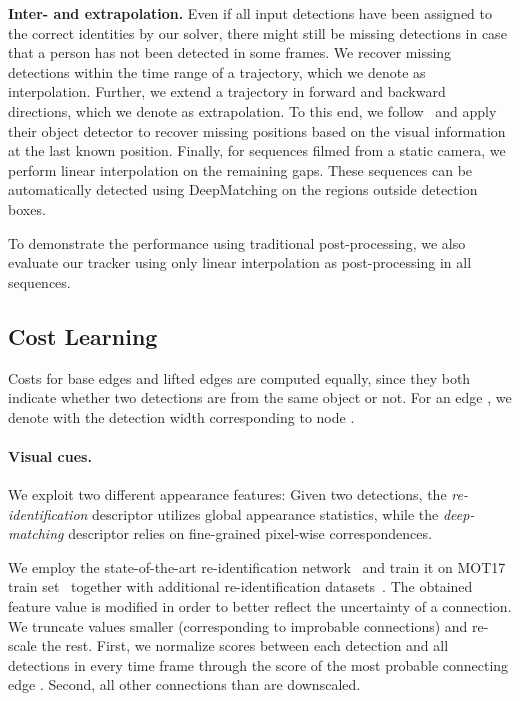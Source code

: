 \documentclass{article}
\begin{document}
\textbf{Inter- and extrapolation.} 
Even if all input detections have been assigned to the correct identities by our solver, there might still be  missing detections in case that a person has not been detected in some frames. We recover missing detections within the time range of a trajectory, which we denote as interpolation. Further, we extend a trajectory in forward and backward directions, which we denote as extrapolation.
To this end, we follow~\cite{bergmann2019tracking} and apply their object detector to recover missing positions based on the visual information at the last known position. 
Finally, for sequences filmed from a static camera, we perform linear interpolation on the remaining gaps. 
These sequences can be automatically detected using DeepMatching on the regions outside detection boxes.



To demonstrate the performance using traditional post-processing, we also evaluate our tracker using only linear interpolation as post-processing in all sequences.


\subsection{Cost Learning}
\label{sec:cost_learning}
Costs for base edges  and lifted edges  are computed equally, since they both indicate whether two detections are from the same object or not.
For an edge , we denote with  the detection width corresponding to node .


\paragraph{Visual cues.}
We exploit two different appearance features:
Given two detections, the \emph{re-identification} descriptor utilizes global appearance statistics, 
while the \emph{deep-matching} descriptor relies on fine-grained pixel-wise correspondences.



We employ the state-of-the-art re-identification network~\cite{zheng2019joint} and train it on MOT17 train set~\cite{MOT16} together with additional re-identification datasets~\cite{zheng2015scalable,wei2018person,ristani2016MTMC}. The obtained feature value  is modified in order to better reflect the uncertainty of a connection.
We truncate values smaller  (corresponding to improbable connections) and re-scale the rest. First, we normalize scores between each detection  and all detections in every time frame  through the score of the most probable connecting edge . Second, all other connections than  are downscaled.
\end{document}
